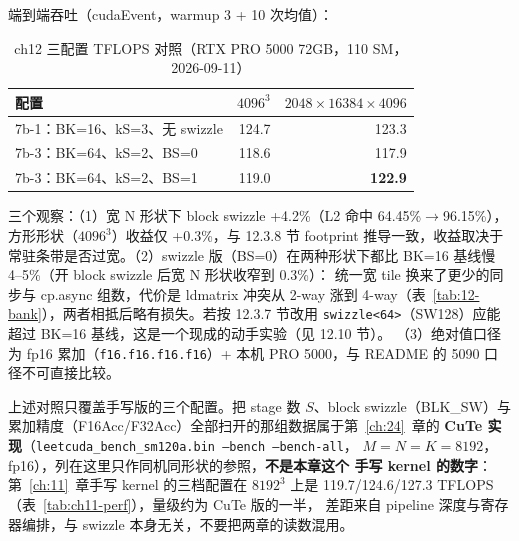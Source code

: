 端到端吞吐（cudaEvent，warmup 3 + 10 次均值）：

\begin{table}[htbp]
\centering
\caption{ch12 三配置 TFLOPS 对照（RTX PRO 5000 72GB，110 SM，2026-09-11）}
\label{tab:12-tflops}
\begin{tabular}{lrr}
\toprule
配置 & $4096^3$ & $2048\times16384\times4096$ \\
\midrule
7b-1：BK=16、kS=3、无 swizzle       & 124.7 & 123.3 \\
7b-3：BK=64、kS=2、BS=0             & 118.6 & 117.9 \\
7b-3：BK=64、kS=2、BS=1             & 119.0 & \textbf{122.9} \\
\bottomrule
\end{tabular}
\end{table}

三个观察：（1）宽 N 形状下 block swizzle +4.2\%（L2 命中 64.45\%$\to$96.15\%），
方形形状（$4096^3$）收益仅 +0.3\%，与 12.3.8 节 footprint 推导一致，收益取决于
常驻条带是否过宽。（2）swizzle 版（BS=0）在两种形状下都比 BK=16 基线慢
4--5\%（开 block swizzle 后宽 N 形状收窄到 0.3\%）：
统一宽 tile 换来了更少的同步与 cp.async 组数，代价是 ldmatrix 冲突从 2-way 涨到
4-way（表~\ref{tab:12-bank}），两者相抵后略有损失。若按 12.3.7 节改用
\texttt{swizzle<64>}（SW128）应能超过 BK=16 基线，这是一个现成的动手实验（见 12.10 节）。
（3）绝对值口径为 fp16 累加（\texttt{f16.f16.f16.f16}）+ 本机 PRO 5000，与
README 的 5090 口径不可直接比较。

上述对照只覆盖手写版的三个配置。把 stage 数 $S$、block swizzle（BLK\_SW）与
累加精度（F16Acc/F32Acc）全部扫开的那组数据属于第~\ref{ch:24}~章的 \textbf{CuTe
实现}（\texttt{leetcuda\_\allowbreak{}bench\_\allowbreak{}sm120a.bin --bench --bench-all}，
$M{=}N{=}K{=}8192$，fp16），列在这里只作同机同形状的参照，\textbf{不是本章这个
手写 kernel 的数字}：第~\ref{ch:11}~章手写 kernel 的三档配置在 $8192^3$ 上是
119.7/124.6/127.3 TFLOPS（表~\ref{tab:ch11-perf}），量级约为 CuTe 版的一半，
差距来自 pipeline 深度与寄存器编排，与 swizzle 本身无关，不要把两章的读数混用。

